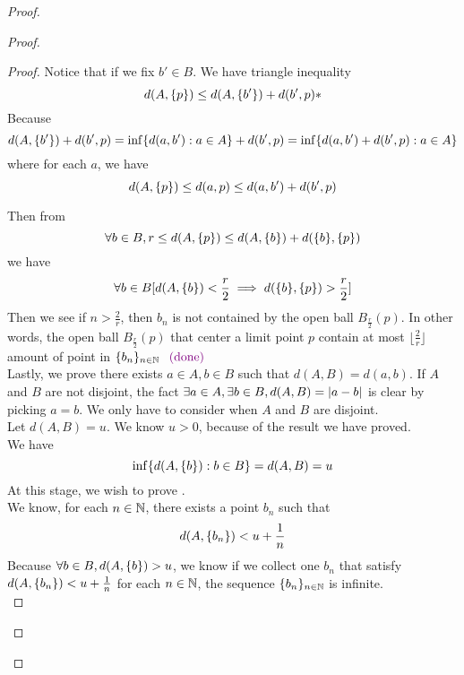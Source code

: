 \documentclass{report}
\begin{document}
\begin{proof}
\begin{proof}
\begin{proof}
Notice that if we fix $b'\in B$. We have triangle inequality
\begin{equation}
d(A,\{ p \})\leq d(A,\{ b' \})+d(b',p)*
\end{equation}
Because 
\begin{equation}
d(A,\{ b' \})+d(b',p)=\inf \{ d(a,b'):a \in A \}+d(b',p)=\inf \{ d(a,b')+d(b',p):a \in A \}
\end{equation}
where for each $a$, we have
 \begin{equation}
d(A,\{ p \})\leq d(a,p)\leq d(a,b')+d(b',p)
\end{equation}



Then from
\begin{equation}
  \forall b\in B, r\leq d(A,\{ p \})\leq d(A,\{ b \})+d(\{ b \},\{ p \})
\end{equation}
we have
\begin{equation}
  \forall b\in B [d(A,\{ b \})< \frac{r}{2}\implies d(\{ b \},\{ p \})>\frac{r}{2}]
\end{equation}
Then we see if $n>\frac{2}{r}$, then $b_n$ is not contained by the open ball  $B_{\frac{r}{2}}(p)$. In other words, the open ball $B_{\frac{r}{2}}(p)$ that center a limit point $p$ contain at most $\lfloor \frac{2}{r}\rfloor$ amount of point in $\{ b_n \}_{n\in\mathbb{N}}$ \CaC$\textcolor{violet}{\text{ (done) }}$\\

Lastly, we prove there exists $a\in A,b\in B$ such that $d(A,B)=d(a,b)$. If  $A$ and  $B$ are not disjoint, the fact $\exists a\in A,\exists b\in B, d(A,B)=|a-b|$ is clear by picking $a=b$. We only have to consider when $A$ and $B$ are disjoint.\\

Let $d(A,B)=u$. We know $u>0$, because of the result we have proved.\\

We have 
\begin{equation}
  \inf \{ d(A,\{ b \}):b\in B \}=d(A,B)=u
\end{equation}
At this stage, we wish to prove . \\

We know, for each $n\in\mathbb{N}$, there exists a point $b_n$ such that
 \begin{equation}
d(A,\{ b_n \})<u+\frac{1}{n}
\end{equation}
Because $\forall b\in B, d(A,\{ b \})>u$, we know if we collect one $b_n$ that satisfy $d(A,\{ b_n \})<u+\frac{1}{n}$ for each $n\in\mathbb{N}$, the sequence $\{ b_n \}_{n\in\mathbb{N}}$ is infinite.\\


\end{proof}
\end{proof}
\end{proof}
\end{document}
